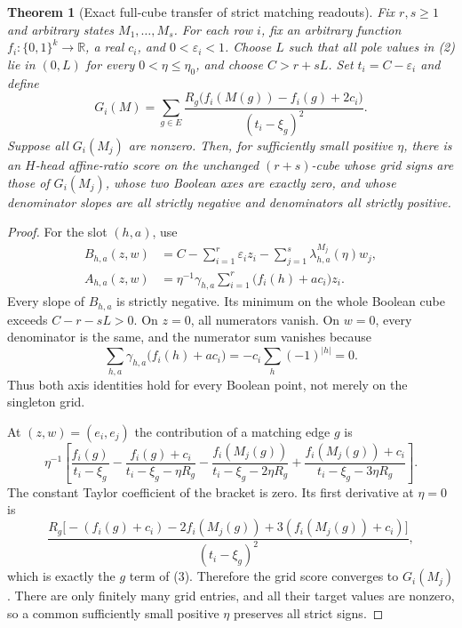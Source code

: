 \documentclass[11pt]{article}
\newtheorem{theorem}{Theorem}
\begin{document}
\begin{theorem}[Exact full-cube transfer of strict matching readouts]
Fix $r,s\geq1$ and arbitrary states $M_1,\ldots,M_s$.
For each row $i$, fix an arbitrary function
$f_i:\{0,1\}^k\to\mathbb R$, a real $c_i$, and
$0<\varepsilon_i<1$. Choose $L$ such that all pole values in (2)
lie in $(0,L)$ for every $0<\eta\leq\eta_0$, and choose
$C>r+sL$. Set $t_i=C-\varepsilon_i$ and define
\[
 G_i(M)=\sum_{g\in E}
    \frac{R_g\bigl(f_i(M(g))-f_i(g)+2c_i\bigr)}{(t_i-\xi_g)^2}.
 \tag{3}
\]
Suppose all $G_i(M_j)$ are nonzero. Then, for sufficiently small
positive $\eta$, there is an $H$-head affine-ratio score on the
unchanged $(r+s)$-cube whose grid signs are those of $G_i(M_j)$,
whose two Boolean axes are exactly zero, and whose denominator slopes
are all strictly negative and denominators all strictly positive.
\end{theorem}
\begin{proof}
For the slot $(h,a)$, use
\[
 \begin{split}
 B_{h,a}(z,w)&=C-\sum_{i=1}^r\varepsilon_i z_i
                   -\sum_{j=1}^s\lambda^{M_j}_{h,a}(\eta)w_j,\\
 A_{h,a}(z,w)&=\eta^{-1}\gamma_{h,a}
                   \sum_{i=1}^r\bigl(f_i(h)+a c_i\bigr)z_i.
 \end{split}
 \tag{4}
\]
Every slope of $B_{h,a}$ is strictly negative. Its minimum on the
whole Boolean cube exceeds $C-r-sL>0$.
On $z=0$, all numerators vanish. On $w=0$, every denominator is
the same, and the numerator sum vanishes because
\[
 \sum_{h,a}\gamma_{h,a}\bigl(f_i(h)+a c_i\bigr)
     =-c_i\sum_h(-1)^{|h|}=0.
 \tag{5}
\]
Thus both axis identities hold for every Boolean point, not merely
on the singleton grid.

At $(z,w)=(e_i,e_j)$ the contribution of a matching edge $g$ is
\[
 \eta^{-1}\left[
 \frac{f_i(g)}{t_i-\xi_g}
 -\frac{f_i(g)+c_i}{t_i-\xi_g-\eta R_g}
 -\frac{f_i(M_j(g))}{t_i-\xi_g-2\eta R_g}
 +\frac{f_i(M_j(g))+c_i}{t_i-\xi_g-3\eta R_g}
 \right].
 \tag{6}
\]
The constant Taylor coefficient of the bracket is zero. Its first
derivative at $\eta=0$ is
\[
 \frac{R_g\bigl[-(f_i(g)+c_i)-2f_i(M_j(g))
                   +3(f_i(M_j(g))+c_i)\bigr]}{(t_i-\xi_g)^2},
\]
which is exactly the $g$ term of (3). Therefore the grid score
converges to $G_i(M_j)$. There are only finitely many grid entries,
and all their target values are nonzero, so a common sufficiently
small positive $\eta$ preserves all strict signs.
\end{proof}
\end{document}
